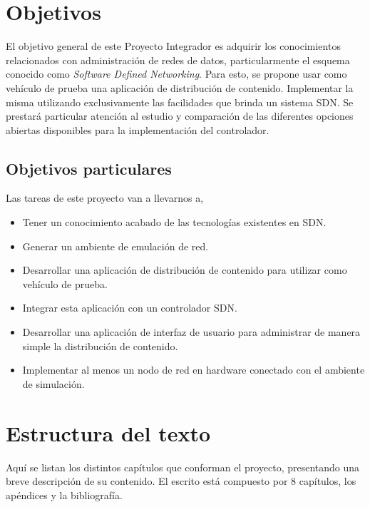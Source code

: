 \section{Objetivos}

El objetivo general de este Proyecto Integrador es adquirir los conocimientos relacionados con administración de redes de datos, particularmente el esquema conocido como \textit{Software Defined Networking}. Para esto, se propone usar como vehículo de prueba una aplicación de distribución de contenido. Implementar la misma utilizando exclusivamente las facilidades que brinda un sistema SDN. Se prestará particular atención al estudio y comparación de las diferentes opciones abiertas disponibles para la implementación del controlador.

\subsection{Objetivos particulares}

Las tareas de este proyecto van a llevarnos a,
\begin{itemize}     
    \item Tener un conocimiento acabado de las tecnologías existentes en SDN.
    \item Generar un ambiente de emulación de red.
    \item Desarrollar una aplicación de distribución de contenido para utilizar como vehículo de prueba.
    \item Integrar esta aplicación con un controlador SDN.
    \item Desarrollar una aplicación de interfaz de usuario para administrar de manera simple la distribución de contenido.
    \item Implementar al menos un nodo de red en hardware conectado con el ambiente de simulación.
\end{itemize}

\section{Estructura del texto}

Aquí se listan los distintos capítulos que conforman el proyecto, presentando una breve descripción de su contenido. El escrito está compuesto por 8 capítulos, los apéndices y la bibliografía.

